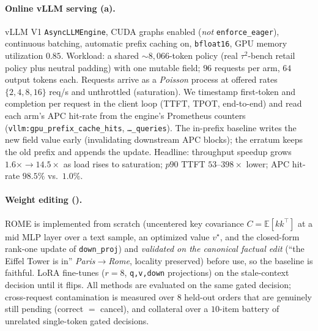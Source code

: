 \paragraph{Online vLLM serving (a).} vLLM V1 \texttt{AsyncLLMEngine}, CUDA graphs enabled
(\emph{not} \texttt{enforce\_eager}), continuous batching, automatic prefix caching on, \texttt{bfloat16},
GPU memory utilization $0.85$. Workload: a shared ${\sim}8{,}066$-token policy (real
$\tau^2$-bench retail policy plus neutral padding) with one mutable field; $96$ requests per arm, $64$
output tokens each. Requests arrive as a \emph{Poisson} process at offered rates $\{2,4,8,16\}$ req/s and
unthrottled (saturation). We timestamp first-token and completion per request in the client loop (TTFT,
TPOT, end-to-end) and read each arm's APC hit-rate from the engine's Prometheus counters
(\texttt{vllm:gpu\_prefix\_cache\_hits}, \texttt{\ldots\_queries}). The in-prefix
baseline writes the new field value
early (invalidating downstream APC blocks); the erratum keeps the old prefix and appends the update.
Headline: throughput speedup grows $1.6\times{\to}14.5\times$ as load rises to saturation; $p90$ TTFT
$53$--$398\times$ lower; APC hit-rate $98.5\%$ vs.\ $1.0\%$.

\paragraph{Weight editing ().} ROME is implemented from scratch (uncentered key covariance
$C{=}\mathbb{E}[kk^\top]$ at a mid MLP layer over a text sample, an optimized value $v^\star$, and the
closed-form rank-one update of \texttt{down\_proj}) and \emph{validated on the canonical factual edit}
(``the Eiffel Tower is in'' \emph{Paris}$\to$\emph{Rome}, locality preserved) before use, so the baseline
is faithful. LoRA fine-tunes ($r{=}8$, \texttt{q,v,down} projections) on the stale-context decision until it
flips. All methods are evaluated on the same gated decision; cross-request contamination is measured over
$8$ held-out orders that are genuinely still pending (correct $=$ cancel), and collateral over a $10$-item
battery of unrelated single-token gated decisions.

